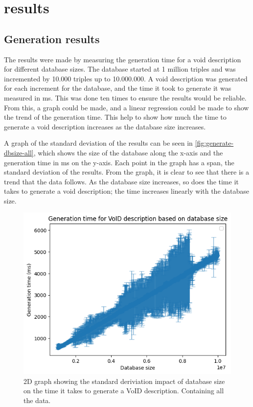 \section{results}\label{sec:results}
\subsection{Generation results}\label{subsec:generation-results}
The results were made by measuring the generation time for a \gls{void} description for different database sizes. The database started at 1 million triples and was incremented by 10.000 triples up to 10.000.000. A \gls{void} description was generated for each increment for the database, and the time it took to generate it was measured in ms. This was done ten times to ensure the results would be reliable. From this, a graph could be made, and a linear regression could be made to show the trend of the generation time. This help to show how much the time to generate a \gls{void} description increases as the database size increases.

A graph of the standard deviation of the results can be seen in \autoref{fig:generate-dbsize-all}, which shows the size of the database along the x-axis and the generation time in ms on the y-axis. Each point in the graph has a span, the standard deviation of the results. From the graph, it is clear to see that there is a trend that the data follows. As the database size increases, so does the time it takes to generate a \gls{void} description; the time increases linearly with the database size.

\begin{figure}[htb!]
    \centering
    \includegraphics[width=0.8\columnwidth]{figures/generation-results-graph.png}
    \caption{2D graph showing the standard deriviation impact of database size on the time it takes to generate a VoID description. Containing all the data.}
    \label{fig:generate-dbsize-all}
\end{figure}


